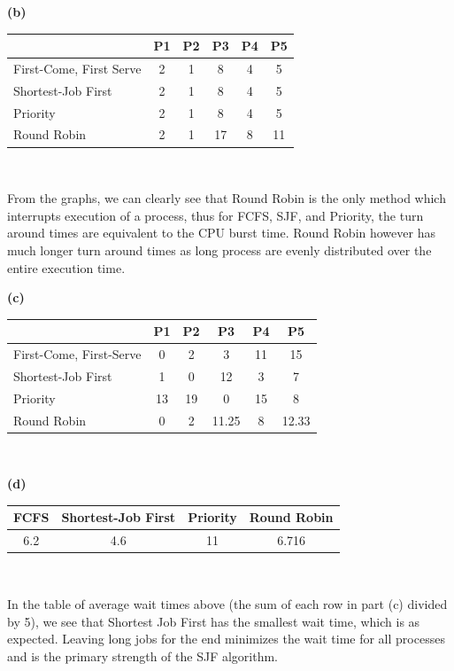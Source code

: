 \documentclass[12pt]{jhwhw}
\begin{document}
	\begin{addmargin}[1em]{}
		\textbf{(b)} \\
		\begin{centering}
		\begin{tabular}{| l | c | c | c | c | c |}
			 \hline
			     & P1 & P2 & P3 & P4 & P5 \\
			 \hline
			First-Come, First Serve & 2 & 1 & 8 & 4 & 5 \\
			\hline
			Shortest-Job First & 2 & 1 & 8 & 4 & 5 \\
			\hline
			Priority & 2 & 1 & 8 & 4 & 5 \\
			\hline
			Round Robin & 2 & 1 & 17 & 8 & 11 \\
			\hline
		\end{tabular} \\
		\end{centering}
		\bigbreak
		From the graphs, we can clearly see that Round Robin is the only
		method which interrupts execution of a process, thus for FCFS, SJF, and
		Priority, the turn around times are equivalent to the CPU burst time.
		Round Robin however has much longer turn around times as long process
		are evenly distributed over the entire execution time.

		\textbf{(c)} \\
		\begin{centering}
		\begin{tabular}{| l | c | c | c | c | c |}
			 \hline
			     & P1 & P2 & P3 & P4 & P5 \\
			 \hline
			First-Come, First-Serve & 0 & 2 & 3 & 11 & 15 \\
			\hline
			Shortest-Job First & 1 & 0 & 12 & 3 & 7 \\
			\hline
			Priority & 13 & 19 & 0 & 15 & 8 \\
			\hline
			Round Robin & 0 & 2 & 11.25 & 8 & 12.33 \\
			\hline
		\end{tabular} \\
		\end{centering}

		\textbf{(d)} \\
		\begin{centering}
		\begin{tabular}{| c | c | c | c |}
			\hline
			FCFS & Shortest-Job First & Priority & Round Robin \\
			\hline
			6.2 & 4.6 & 11 & 6.716 \\
			\hline
		\end{tabular} \\
		\end{centering}
		\bigbreak
		In the table of average wait times above (the sum of each row in part (c) divided
		by 5), we see that Shortest Job First has the smallest wait time, which is as 
		expected. Leaving long jobs for the end minimizes the wait time for all 
		processes and is the primary strength of the SJF algorithm.

	\end{addmargin}
	\bigbreak
\end{document}
